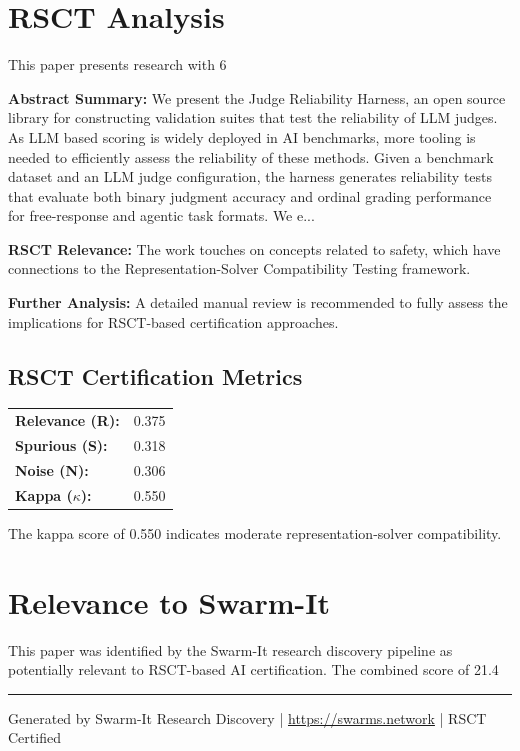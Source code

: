 \documentclass[11pt,a4paper]{article}
\begin{document}
\section{RSCT Analysis}
This paper presents research with 6%

\textbf{Abstract Summary:} We present the Judge Reliability Harness, an open source library for constructing validation suites that test the reliability of LLM judges. As LLM based scoring is widely deployed in AI benchmarks, more tooling is needed to efficiently assess the reliability of these methods. Given a benchmark dataset and an LLM judge configuration, the harness generates reliability tests that evaluate both binary judgment accuracy and ordinal grading performance for free-response and agentic task formats. We e...

\textbf{RSCT Relevance:} The work touches on concepts related to safety, which have connections to the Representation-Solver Compatibility Testing framework.

\textbf{Further Analysis:} A detailed manual review is recommended to fully assess the implications for RSCT-based certification approaches.


\subsection*{RSCT Certification Metrics}
\begin{tabular}{ll}
\textbf{Relevance (R):} & 0.375 \\
\textbf{Spurious (S):} & 0.318 \\
\textbf{Noise (N):} & 0.306 \\
\textbf{Kappa ($\kappa$):} & 0.550 \\
\end{tabular}

The kappa score of 0.550 indicates moderate representation-solver compatibility.


\section{Relevance to Swarm-It}
This paper was identified by the Swarm-It research discovery pipeline as potentially relevant to RSCT-based AI certification. The combined score of 21.4%

\vspace{1em}
\hrule
\vspace{0.5em}
\small{Generated by Swarm-It Research Discovery | \url{https://swarms.network} | RSCT Certified}
\end{document}
